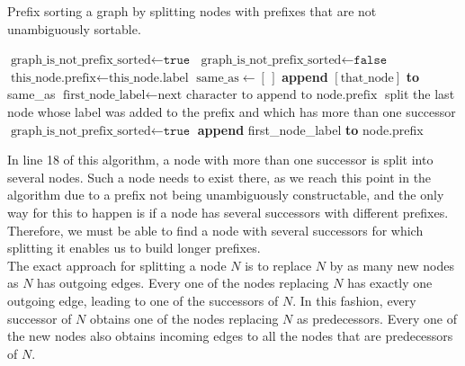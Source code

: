 \documentclass[a4paper,12pt,twoside,BCOR=10mm]{scrbook}
\begin{document}
\begin{algorithm}
\caption[Prefix sort a graph]{Prefix sorting a graph by splitting nodes with prefixes that are not unambiguously sortable.}
\label{alg:workOnAutomatonPrefixes}
\begin{algorithmic}[1]
\State $ \textrm{graph\_is\_not\_prefix\_sorted} \gets \texttt{true} $
	\State $ \textrm{graph\_is\_not\_prefix\_sorted} \gets \texttt{false} $
		\State $ \textrm{this\_node.prefix} \gets \textrm{this\_node.label} $
	\EndFor
		\State $ \textrm{same\_as} \gets [ \, ] $
				\State \textbf{append} $ [\textrm{that\_node}] $ \textbf{to} same\_as
			\EndIf
		\EndFor
				\State $ \textrm{first\_node\_label} \gets \textrm{next character to append to node.prefix} $
					\State split the last node whose label was added to the prefix and which
						\State \phantom{first} has more than one successor
					\State $ \textrm{graph\_is\_not\_prefix\_sorted} \gets \texttt{true} $
				\Else
					\State \textbf{append} first\_node\_label \textbf{to} node.prefix
				\EndIf
			\EndFor
		\EndIf
	\EndFor
\EndWhile
\end{algorithmic}
\end{algorithm}
In line 18 of this algorithm, a node with more than one successor is split into several nodes. 
Such a node needs to exist there, as we reach this point in the algorithm due to a prefix 
not being unambiguously constructable, and the only way for this to happen is if a node has 
several successors with different prefixes. Therefore, we must be able to find a node with 
several successors for which splitting it enables us to build longer prefixes. \\
The exact approach for splitting a node $ N $ is to replace $ N $ by as many new nodes as $ N $ has 
outgoing edges. 
Every one of the nodes replacing $ N $ has exactly one outgoing edge, leading to 
one of the successors of $ N $. 
In this fashion, every successor of $ N $ obtains one of the nodes replacing $ N $ as predecessors. 
Every one of the new nodes also obtains incoming edges to all the nodes that are predecessors of $ N $. 
\end{document}
